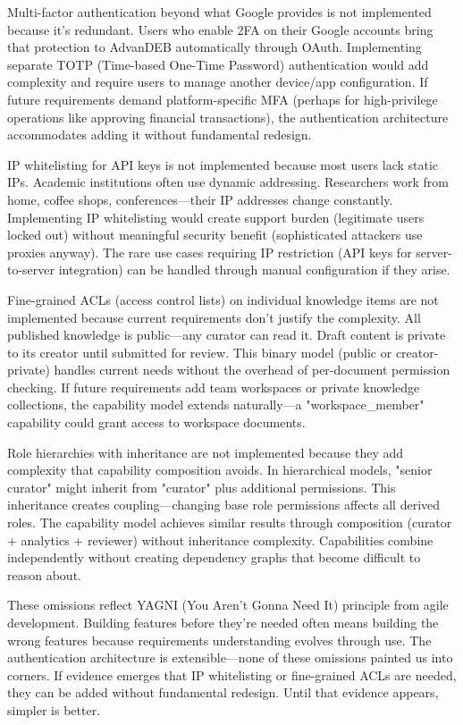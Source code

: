 \documentclass[12pt,a4paper]{article}
\begin{document}
Multi-factor authentication beyond what Google provides is not implemented because it's redundant. Users who enable 2FA on their Google accounts bring that protection to AdvanDEB automatically through OAuth. Implementing separate TOTP (Time-based One-Time Password) authentication would add complexity and require users to manage another device/app configuration. If future requirements demand platform-specific MFA (perhaps for high-privilege operations like approving financial transactions), the authentication architecture accommodates adding it without fundamental redesign.

IP whitelisting for API keys is not implemented because most users lack static IPs. Academic institutions often use dynamic addressing. Researchers work from home, coffee shops, conferences—their IP addresses change constantly. Implementing IP whitelisting would create support burden (legitimate users locked out) without meaningful security benefit (sophisticated attackers use proxies anyway). The rare use cases requiring IP restriction (API keys for server-to-server integration) can be handled through manual configuration if they arise.

Fine-grained ACLs (access control lists) on individual knowledge items are not implemented because current requirements don't justify the complexity. All published knowledge is public—any curator can read it. Draft content is private to its creator until submitted for review. This binary model (public or creator-private) handles current needs without the overhead of per-document permission checking. If future requirements add team workspaces or private knowledge collections, the capability model extends naturally—a "workspace\_member" capability could grant access to workspace documents.

Role hierarchies with inheritance are not implemented because they add complexity that capability composition avoids. In hierarchical models, "senior curator" might inherit from "curator" plus additional permissions. This inheritance creates coupling—changing base role permissions affects all derived roles. The capability model achieves similar results through composition (curator + analytics + reviewer) without inheritance complexity. Capabilities combine independently without creating dependency graphs that become difficult to reason about.

These omissions reflect YAGNI (You Aren't Gonna Need It) principle from agile development. Building features before they're needed often means building the wrong features because requirements understanding evolves through use. The authentication architecture is extensible—none of these omissions painted us into corners. If evidence emerges that IP whitelisting or fine-grained ACLs are needed, they can be added without fundamental redesign. Until that evidence appears, simpler is better.
\end{document}
